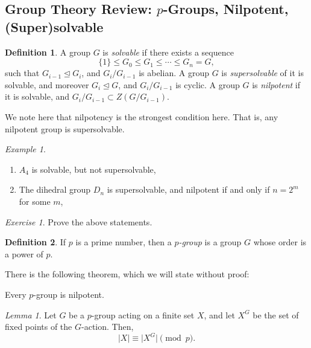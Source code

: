 \documentclass[a4paper]{report}
\theoremstyle{definition}
\newtheorem{definition}{Definition}
\theoremstyle{remark}
\theoremstyle{proposition}
\theoremstyle{conjecture}
\theoremstyle{lemma}
\newtheorem{lemma}{Lemma}
\theoremstyle{corollary}
\theoremstyle{exercise}
\newtheorem{exercise}{Exercise}
\theoremstyle{example}
\newtheorem{example}{Example}
\begin{document}
\subsection{Group Theory Review: $p$-Groups, Nilpotent, (Super)solvable}

\begin{definition}
    A group $G$ is \emph{solvable} if there exists a sequence
    $$\lbrace 1\rbrace \leq G_0 \leq G_1 \leq \cdots \leq G_n = G,$$
    such that $G_{i-1} \trianglelefteq G_i$, and 
    $G_i/G_{i-1}$ is abelian. A group $G$ is \emph{supersolvable} of 
    it is solvable, and moreover $G_i \trianglelefteq G$, and 
    $G_i/G_{i-1}$ is cyclic.
    A group $G$ is \emph{nilpotent} if it is solvable, and 
    $G_i/G_{i-1} \subset Z(G/G_{i-1})$.
\end{definition}

We note here that nilpotency is the strongest condition here. 
That is, any nilpotent group is supersolvable.

\begin{example}
    \leavevmode
    \begin{enumerate}
        \item $A_4$ is solvable, but not supersolvable,
        \item The dihedral group $D_n$ is supersolvable, and nilpotent 
            if and only if $n = 2^m$ for some $m$,
    \end{enumerate}
\end{example}

\begin{exercise}
    Prove the above statements.
\end{exercise}

\begin{definition}
    If $p$ is a prime number, then a \emph{$p$-group} is a group $G$ 
    whose order is a power of $p$.
\end{definition}

There is the following theorem, which we will state without proof:

\begin{theorem}
    Every $p$-group is nilpotent.
\end{theorem}

\begin{lemma}\label{lem5}
    Let $G$ be a $p$-group acting on a finite set $X$,
    and let $X^G$ be the set of fixed points of the $G$-action.
    Then, $$\vert X \vert \equiv \vert X^G\vert \pmod{p}.$$
\end{lemma}
\end{document}
